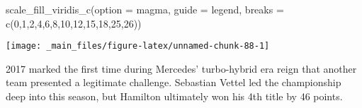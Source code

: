 \documentclass[
]{book}
\newenvironment{Shaded}{\begin{snugshade}}{\end{snugshade}}
\newcommand{\AttributeTok}[1]{\textcolor[rgb]{0.77,0.63,0.00}{#1}}
\newcommand{\DecValTok}[1]{\textcolor[rgb]{0.00,0.00,0.81}{#1}}
\newcommand{\FunctionTok}[1]{\textcolor[rgb]{0.00,0.00,0.00}{#1}}
\newcommand{\NormalTok}[1]{#1}
\newcommand{\StringTok}[1]{\textcolor[rgb]{0.31,0.60,0.02}{#1}}
\begin{document}
\begin{Shaded}
\begin{Highlighting}[]
  \FunctionTok{scale\_fill\_viridis\_c}\NormalTok{(}\AttributeTok{option =} \StringTok{\textquotesingle{}magma\textquotesingle{}}\NormalTok{,}
                       \AttributeTok{guide =} \StringTok{\textquotesingle{}legend\textquotesingle{}}\NormalTok{,}
                       \AttributeTok{breaks =} \FunctionTok{c}\NormalTok{(}\DecValTok{0}\NormalTok{,}\DecValTok{1}\NormalTok{,}\DecValTok{2}\NormalTok{,}\DecValTok{4}\NormalTok{,}\DecValTok{6}\NormalTok{,}\DecValTok{8}\NormalTok{,}\DecValTok{10}\NormalTok{,}\DecValTok{12}\NormalTok{,}\DecValTok{15}\NormalTok{,}\DecValTok{18}\NormalTok{,}\DecValTok{25}\NormalTok{,}\DecValTok{26}\NormalTok{))}
\end{Highlighting}
\end{Shaded}

\begin{center}\texttt{[image: \_main\_files/figure-latex/unnamed-chunk-88-1]} \end{center}

2017 marked the first time during Mercedes' turbo-hybrid era reign that another team presented a legitimate challenge. Sebastian Vettel led the championship deep into this season, but Hamilton ultimately won his 4th title by 46 points.
\end{document}

